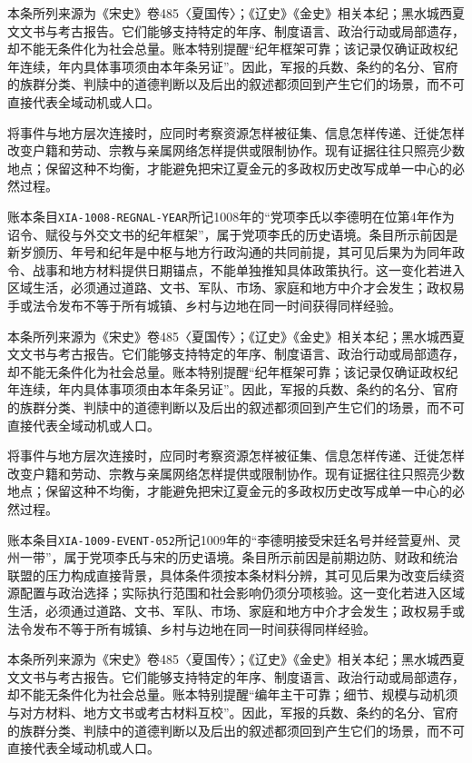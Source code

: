 本条所列来源为《宋史》卷485〈夏国传〉；《辽史》《金史》相关本纪；黑水城西夏文文书与考古报告。它们能够支持特定的年序、制度语言、政治行动或局部遗存，却不能无条件化为社会总量。账本特别提醒“纪年框架可靠；该记录仅确证政权纪年连续，年内具体事项须由本年条另证”。因此，军报的兵数、条约的名分、官府的族群分类、判牍中的道德判断以及后出的叙述都须回到产生它们的场景，而不可直接代表全域动机或人口。

将事件与地方层次连接时，应同时考察资源怎样被征集、信息怎样传递、迁徙怎样改变户籍和劳动、宗教与亲属网络怎样提供或限制协作。现有证据往往只照亮少数地点；保留这种不均衡，才能避免把宋辽夏金元的多政权历史改写成单一中心的必然过程。

账本条目\texttt{XIA-1008-REGNAL-YEAR}所记1008年的“党项李氏以李德明在位第4年作为诏令、赋役与外交文书的纪年框架”，属于党项李氏的历史语境。条目所示前因是新岁颁历、年号和纪年是中枢与地方行政沟通的共同前提，其可见后果为为同年政令、战事和地方材料提供日期锚点，不能单独推知具体政策执行。这一变化若进入区域生活，必须通过道路、文书、军队、市场、家庭和地方中介才会发生；政权易手或法令发布不等于所有城镇、乡村与边地在同一时间获得同样经验。

本条所列来源为《宋史》卷485〈夏国传〉；《辽史》《金史》相关本纪；黑水城西夏文文书与考古报告。它们能够支持特定的年序、制度语言、政治行动或局部遗存，却不能无条件化为社会总量。账本特别提醒“纪年框架可靠；该记录仅确证政权纪年连续，年内具体事项须由本年条另证”。因此，军报的兵数、条约的名分、官府的族群分类、判牍中的道德判断以及后出的叙述都须回到产生它们的场景，而不可直接代表全域动机或人口。

将事件与地方层次连接时，应同时考察资源怎样被征集、信息怎样传递、迁徙怎样改变户籍和劳动、宗教与亲属网络怎样提供或限制协作。现有证据往往只照亮少数地点；保留这种不均衡，才能避免把宋辽夏金元的多政权历史改写成单一中心的必然过程。

账本条目\texttt{XIA-1009-EVENT-052}所记1009年的“李德明接受宋廷名号并经营夏州、灵州一带”，属于党项李氏与宋的历史语境。条目所示前因是前期边防、财政和统治联盟的压力构成直接背景，具体条件须按本条材料分辨，其可见后果为改变后续资源配置与政治选择；实际执行范围和社会影响仍须分项核验。这一变化若进入区域生活，必须通过道路、文书、军队、市场、家庭和地方中介才会发生；政权易手或法令发布不等于所有城镇、乡村与边地在同一时间获得同样经验。

本条所列来源为《宋史》卷485〈夏国传〉；《辽史》《金史》相关本纪；黑水城西夏文文书与考古报告。它们能够支持特定的年序、制度语言、政治行动或局部遗存，却不能无条件化为社会总量。账本特别提醒“编年主干可靠；细节、规模与动机须与对方材料、地方文书或考古材料互校”。因此，军报的兵数、条约的名分、官府的族群分类、判牍中的道德判断以及后出的叙述都须回到产生它们的场景，而不可直接代表全域动机或人口。

